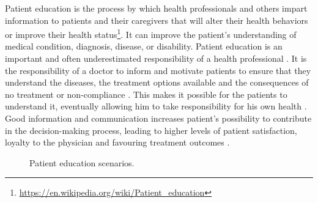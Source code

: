 Patient education is the process by which health professionals and others impart information to patients and their caregivers that will alter their health behaviors or improve their health status\footnote{\url{https://en.wikipedia.org/wiki/Patient_education}}. It can improve the patient's understanding of medical condition, diagnosis, disease, or disability. Patient education is an important and often underestimated responsibility of a health professional \cite{Waitzkin1984}.
It is the responsibility of a doctor to inform and motivate patients to ensure that they understand the diseases, the treatment options available and the consequences of no treatment or non-compliance \cite{Fenol2010}. This makes it possible for the patients to understand it, eventually allowing him to take responsibility for his own health \cite{Ammann2010}. Good information and communication increases patient's possibility to contribute in the decision-making process, leading to higher levels of patient satisfaction, loyalty to the physician and favouring treatment outcomes \cite{Huber2012b,Ammann2010,Cleeren2014}. 
\begin{figure}
	\centering
	\quad
	\caption{Patient education scenarios.}
	\label{fig:2-bg:patientEducation}
\end{figure}
